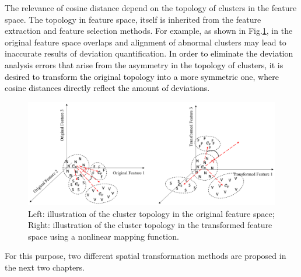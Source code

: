 The relevance of cosine distance depend on the topology of clusters in the feature space. The topology in feature space, itself is inherited from the feature extraction and feature selection methods. For example, as shown in Fig.\ref{fig:topo1}, in the original feature space overlaps and alignment of abnormal clusters may lead to inaccurate results of deviation quantification. \textcolor{black}{In order to eliminate the deviation analysis errors that arise from the asymmetry in the topology of clusters, it is desired to transform the original topology into a more symmetric one, where cosine distances directly reflect the amount of deviations.}

\begin{figure}[thpb]
\centering
\includegraphics[scale=.5]{Fig/topo1.png}
\caption{Left: illustration of the cluster topology in the original feature space; Right: illustration of the cluster topology in the transformed feature space using a nonlinear mapping function.}
\label{fig:topo1}
\end{figure}

For this purpose, two different spatial transformation methods are proposed in the next two chapters.

